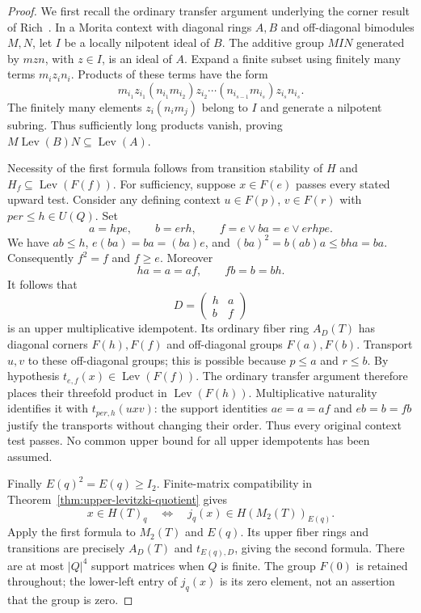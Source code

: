 \begin{proof}
We first recall the ordinary transfer argument underlying the corner
result of Rich~\cite[Corollary~1, p.~57]{Rich}. In a Morita context with
diagonal rings $A,B$ and off-diagonal bimodules $M,N$, let $I$ be a
locally nilpotent ideal of $B$. The additive group $MIN$ generated by
$mzn$, with $z\in I$, is an ideal of $A$. Expand a finite subset using
finitely many terms $m_i z_i n_i$. Products of these terms have the form
\[
 m_{i_1}z_{i_1}(n_{i_1}m_{i_2})z_{i_2}\cdots
 (n_{i_{s-1}}m_{i_s})z_{i_s}n_{i_s}.
\]
The finitely many elements $z_i(n_i m_j)$ belong to $I$ and generate
a nilpotent subring. Thus sufficiently long products vanish, proving
$M\operatorname{Lev}(B)N\subseteq\operatorname{Lev}(A)$.

Necessity of the first formula follows from transition stability of
$H$ and $H_f\subseteq\operatorname{Lev}(F(f))$. For sufficiency, suppose
$x\in F(e)$ passes every stated upward test. Consider any defining
context $u\in F(p)$, $v\in F(r)$ with $per\leq h\in U(Q)$. Set
\[
 a=hpe,\qquad b=erh,\qquad f=e\vee ba=e\vee erhpe.
\]
We have $ab\leq h$, $e(ba)=ba=(ba)e$, and
$(ba)^2=b(ab)a\leq bha=ba$. Consequently $f^2=f$ and $f\geq e$.
Moreover
\[
 ha=a=af,\qquad fb=b=bh.
\]
It follows that
\[
 D=\begin{pmatrix}h&a\\b&f\end{pmatrix}
\]
is an upper multiplicative idempotent. Its ordinary fiber ring
$A_D(T)$ has diagonal corners $F(h),F(f)$ and off-diagonal groups
$F(a),F(b)$. Transport $u,v$ to these off-diagonal groups; this is
possible because $p\leq a$ and $r\leq b$. By hypothesis
$t_{e,f}(x)\in\operatorname{Lev}(F(f))$. The ordinary transfer argument
therefore places their threefold product in
$\operatorname{Lev}(F(h))$. Multiplicative naturality identifies it
with $t_{per,h}(uxv)$: the support identities $ae=a=af$ and
$eb=b=fb$ justify the transports without changing their order.
Thus every original context test passes. No common upper bound for
all upper idempotents has been assumed.

Finally $E(q)^2=E(q)\geq I_2$. Finite-matrix compatibility in
Theorem~\ref{thm:upper-levitzki-quotient} gives
\[
 x\in H(T)_q\quad\Longleftrightarrow\quad
 j_q(x)\in H(M_2(T))_{E(q)}.
\]
Apply the first formula to $M_2(T)$ and $E(q)$. Its upper fiber rings
and transitions are precisely $A_D(T)$ and $t_{E(q),D}$, giving the
second formula. There are at most $|Q|^4$ support matrices when $Q$
is finite. The group $F(0)$ is retained throughout; the lower-left
entry of $j_q(x)$ is its zero element, not an assertion that the
group is zero.
\end{proof}
